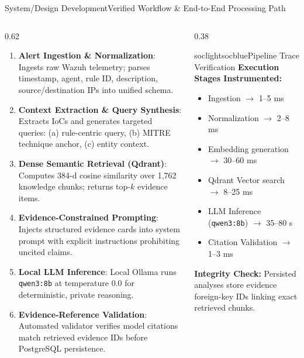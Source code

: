 \documentclass[aspectratio=169, 10pt]{beamer}
\begin{document}
\begin{frame}{System/Design Development}{Verified Workflow \& End-to-End Processing Path}
  \begin{columns}[T]
    \begin{column}{0.62\textwidth}
      \begin{enumerate}\setlength{\itemsep}{3pt}\scriptsize
        \item \textbf{Alert Ingestion \& Normalization}: Ingests raw Wazuh telemetry; parses timestamp, agent, rule ID, description, source/destination IPs into unified schema.
        \item \textbf{Context Extraction \& Query Synthesis}: Extracts IoCs and generates targeted queries: (a) rule-centric query, (b) MITRE technique anchor, (c) entity context.
        \item \textbf{Dense Semantic Retrieval (Qdrant)}: Computes 384-d cosine similarity over 1,762 knowledge chunks; returns top-$k$ evidence items.
        \item \textbf{Evidence-Constrained Prompting}: Injects structured evidence cards into system prompt with explicit instructions prohibiting uncited claims.
        \item \textbf{Local LLM Inference}: Local Ollama runs \texttt{qwen3:8b} at temperature 0.0 for deterministic, private reasoning.
        \item \textbf{Evidence-Reference Validation}: Automated validator verifies model citations match retrieved evidence IDs before PostgreSQL persistence.
      \end{enumerate}
    \end{column}

    \begin{column}{0.38\textwidth}
      \begin{cardbox}{soclight}{socblue}{Pipeline Trace Verification}
        \scriptsize
        \textbf{Execution Stages Instrumented:}
        \begin{itemize}\setlength{\itemsep}{1.5pt}
          \item Ingestion $\to$ 1--5 ms
          \item Normalization $\to$ 2--8 ms
          \item Embedding generation $\to$ 30--60 ms
          \item Qdrant Vector search $\to$ 8--25 ms
          \item LLM Inference (\texttt{qwen3:8b}) $\to$ 35--80 s
          \item Citation Validation $\to$ 1--3 ms
        \end{itemize}
        \vspace{2pt}
        \textcolor{socnavy}{\textbf{Integrity Check:}} Persisted analyses store evidence foreign-key IDs linking exact retrieved chunks.
      \end{cardbox}
    \end{column}
  \end{columns}
\end{frame}
\end{document}
